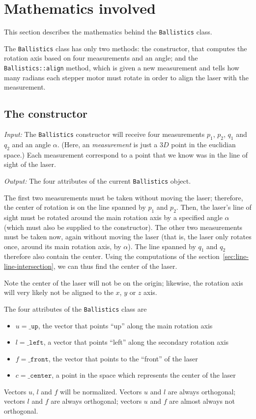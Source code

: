 \documentclass{article}
\newcommand\class[1]{\texttt{#1}}
\newcommand\method[1]{\texttt{#1}}
\newcommand\attribute[1]{\texttt{#1}}
\begin{document}
\section{Mathematics involved}
\label{sec:math}

This section describes the mathematics behind the \class{Ballistics} class.

The \class{Ballistics} class has only two methods: the constructor,
that computes the rotation axis based on four measurements and an angle;
and the \method{Ballistics::align} method,
which is given a new measurement and tells how many radians
each stepper motor must rotate in order to align the laser with the measurement.

\subsection{The constructor}
\label{sec:ballistics-constructor}

\emph{Input:}
The \class{Ballistics} constructor will receive four measurements
$p_1$, $p_2$, $q_1$ and $q_2$ and an angle $\alpha$.
(Here, an \emph{measurement} is just a $3D$ point in the euclidian space.)
Each measurement correspond to a point
that we know was in the line of sight of the laser.

\noindent \emph{Output:}
The four attributes of the current \class{Ballistics} object.

The first two measurements must be taken without moving the laser;
therefore, the center of rotation is on the line spanned by $p_1$ and $p_2$.
Then, the laser's line of sight must be rotated around the main rotation axis
by a specified angle $\alpha$ (which must also be supplied to the constructor).
The other two measurements must be taken now, again without moving the laser
(that is, the laser only rotates once, around its main rotation axis, by $\alpha$).
The line spanned by $q_1$ and $q_2$ therefore also contain the center.
Using the computations of the section~\ref{sec:line-line-intersection},
we can thus find the center of the laser.

Note the center of the laser will not be on the origin;
likewise, the rotation axis will very likely not be aligned to
the $x$, $y$ or $z$ axis.

The four attributes of the \class{Ballistics} class are
\begin{itemize}
    \item $u = \attribute{\_up}$,
        the vector that points ``up'' along the main rotation axis
    \item $l = \attribute{\_left}$,
        a vector that points ``left'' along the secondary rotation axis
    \item $f = \attribute{\_front}$,
        the vector that points to the ``front'' of the laser
    \item $c = \attribute{\_center}$,
        a point in the space which represents the center of the laser
\end{itemize}
Vectors $u$, $l$ and $f$ will be normalized.
Vectors $u$ and $l$ are always orthogonal;
vectors $l$ and $f$ are always orthogonal;
vectors $u$ and $f$ are almost always not orthogonal.
\end{document}
